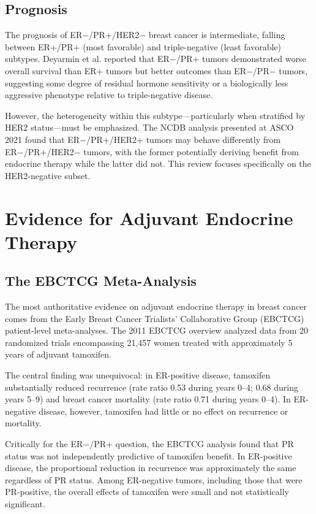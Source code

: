 \documentclass{article}
\begin{document}
\subsection{Prognosis}

The prognosis of ER−/PR+/HER2− breast cancer is intermediate, falling between ER+/PR+ (most favorable) and triple-negative (least favorable) subtypes. Deyarmin et al. \citep{deyarmin2015} reported that ER−/PR+ tumors demonstrated worse overall survival than ER+ tumors but better outcomes than ER−/PR− tumors, suggesting some degree of residual hormone sensitivity or a biologically less aggressive phenotype relative to triple-negative disease.

However, the heterogeneity within this subtype—particularly when stratified by HER2 status—must be emphasized. The NCDB analysis presented at ASCO 2021 \citep{asco2021ncdb} found that ER−/PR+/HER2+ tumors may behave differently from ER−/PR+/HER2− tumors, with the former potentially deriving benefit from endocrine therapy while the latter did not. This review focuses specifically on the HER2-negative subset.

\section{Evidence for Adjuvant Endocrine Therapy}

\subsection{The EBCTCG Meta-Analysis}

The most authoritative evidence on adjuvant endocrine therapy in breast cancer comes from the Early Breast Cancer Trialists' Collaborative Group (EBCTCG) patient-level meta-analyses. The 2011 EBCTCG overview \citep{ebctcg2011} analyzed data from 20 randomized trials encompassing 21,457 women treated with approximately 5 years of adjuvant tamoxifen.

The central finding was unequivocal: in ER-positive disease, tamoxifen substantially reduced recurrence (rate ratio 0.53 during years 0–4; 0.68 during years 5–9) and breast cancer mortality (rate ratio 0.71 during years 0–4). In ER-negative disease, however, tamoxifen had little or no effect on recurrence or mortality.

Critically for the ER−/PR+ question, the EBCTCG analysis found that PR status was not independently predictive of tamoxifen benefit. In ER-positive disease, the proportional reduction in recurrence was approximately the same regardless of PR status. Among ER-negative tumors, including those that were PR-positive, the overall effects of tamoxifen were small and not statistically significant.
\end{document}
